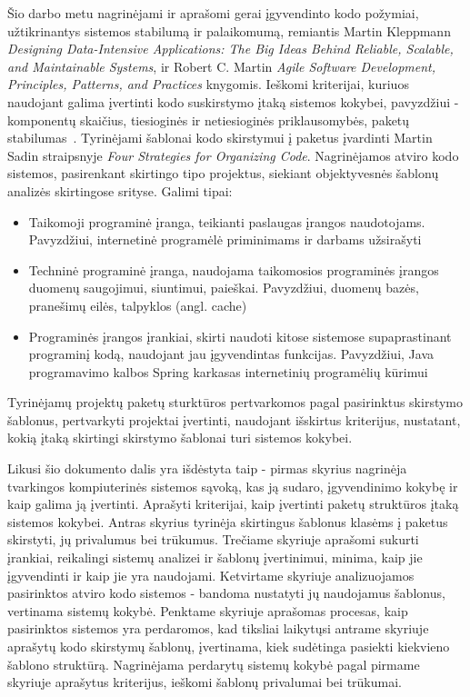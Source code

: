 Šio darbo metu nagrinėjami ir aprašomi gerai įgyvendinto kodo požymiai, užtikrinantys
sistemos stabilumą ir palaikomumą, remiantis Martin Kleppmann \textit{Designing Data-Intensive Applications: The Big Ideas Behind Reliable, Scalable, and Maintainable Systems},
ir Robert C. Martin \textit{Agile Software Development, Principles, Patterns, and Practices} knygomis.
Ieškomi kriterijai, kuriuos naudojant galima įvertinti kodo suskirstymo įtaką sistemos kokybei, pavyzdžiui - komponentų skaičius,
tiesioginės ir netiesioginės priklausomybės, paketų stabilumas~\cite{AgileSoftwareDevelopment}.
Tyrinėjami šablonai kodo skirstymui į paketus įvardinti Martin Sadin straipsnyje \textit{Four Strategies for Organizing Code}.
Nagrinėjamos atviro kodo sistemos, pasirenkant skirtingo tipo projektus, siekiant
objektyvesnės šablonų analizės skirtingose srityse.
Galimi tipai:
    \begin{itemize}
        \item Taikomoji programinė įranga, teikianti paslaugas įrangos naudotojams. Pavyzdžiui,
internetinė programėlė priminimams ir darbams užsirašyti
        \item Techninė programinė įranga, naudojama taikomosios programinės įrangos duomenų
saugojimui, siuntimui, paieškai. Pavyzdžiui, duomenų bazės, pranešimų eilės, talpyklos
(angl. cache)
        \item Programinės įrangos įrankiai, skirti naudoti kitose sistemose supaprastinant programinį
kodą, naudojant jau įgyvendintas funkcijas. Pavyzdžiui, Java programavimo kalbos
Spring karkasas internetinių programėlių kūrimui
    \end{itemize}
Tyrinėjamų projektų paketų sturktūros pertvarkomos pagal pasirinktus skirstymo šablonus, pertvarkyti projektai įvertinti, naudojant išskirtus kriterijus, nustatant, kokią įtaką
skirtingi skirstymo šablonai turi sistemos kokybei.

Likusi šio dokumento dalis yra išdėstyta taip - pirmas skyrius nagrinėja tvarkingos kompiuterinės sistemos sąvoką, kas ją sudaro, įgyvendinimo kokybę ir kaip galima ją įvertinti.
Aprašyti kriterijai, kaip įvertinti paketų struktūros įtaką sistemos kokybei.
Antras skyrius tyrinėja skirtingus šablonus klasėms į paketus skirstyti, jų privalumus bei trūkumus.
Trečiame skyriuje aprašomi sukurti įrankiai, reikalingi sistemų analizei ir šablonų įvertinimui, minima, kaip jie įgyvendinti ir kaip jie yra naudojami.
Ketvirtame skyriuje analizuojamos pasirinktos atviro kodo sistemos - bandoma nustatyti jų naudojamus šablonus, vertinama sistemų kokybė.
Penktame skyriuje aprašomas procesas, kaip pasirinktos sistemos yra perdaromos, kad tiksliai laikytųsi antrame skyriuje aprašytų kodo skirstymų šablonų, įvertinama, kiek sudėtinga pasiekti kiekvieno šablono struktūrą.
Nagrinėjama perdarytų sistemų kokybė pagal pirmame skyriuje aprašytus kriterijus, ieškomi šablonų privalumai bei trūkumai.

